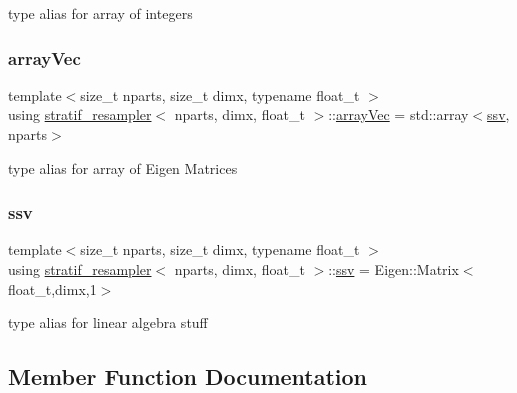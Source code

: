 type alias for array of integers \mbox{\label{classstratif__resampler_aafc4c3078fcc2912b41ad76465d86491}} 
\subsubsection{\texorpdfstring{array\+Vec}{arrayVec}}
{\footnotesize\ttfamily template$<$size\+\_\+t nparts, size\+\_\+t dimx, typename float\+\_\+t $>$ \\
using \hyperlink{classstratif__resampler}{stratif\+\_\+resampler}$<$ nparts, dimx, float\+\_\+t $>$\+::\hyperlink{classrbase_aa12fc826befa6ba0647b5f59ebc396ee}{array\+Vec} =  std\+::array$<$\hyperlink{classrbase_ae20e0b8df15aa109252f57ecbf1f20f8}{ssv}, nparts$>$}

type alias for array of Eigen Matrices \mbox{\label{classstratif__resampler_a9b8a1de85ef718528f4c889678a9331f}} 
\subsubsection{\texorpdfstring{ssv}{ssv}}
{\footnotesize\ttfamily template$<$size\+\_\+t nparts, size\+\_\+t dimx, typename float\+\_\+t $>$ \\
using \hyperlink{classstratif__resampler}{stratif\+\_\+resampler}$<$ nparts, dimx, float\+\_\+t $>$\+::\hyperlink{classrbase_ae20e0b8df15aa109252f57ecbf1f20f8}{ssv} =  Eigen\+::\+Matrix$<$float\+\_\+t,dimx,1$>$}

type alias for linear algebra stuff 

\subsection{Member Function Documentation}
\mbox{\label{classstratif__resampler_a2588147563bf3fe598e262cae7e125e6}} 
